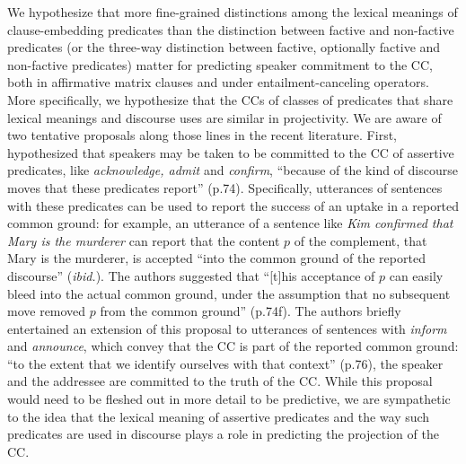 \documentclass[11pt,fleqn]{article}
\newcommand{\6}{\mbox{$[\hspace*{-.6mm}[$}}
\newcommand{\9}{\mbox{$]\hspace*{-.6mm}]$}}
\begin{document}
{We hypothesize that more fine-grained distinctions among the lexical meanings of clause-embedding predicates than the distinction between factive and non-factive predicates (or the three-way distinction between factive, optionally factive and non-factive predicates) matter for predicting speaker commitment to the CC, both in affirmative matrix clauses and under entailment-canceling operators. More specifically, we hypothesize that the CCs of classes of predicates that share lexical meanings and discourse uses are similar in projectivity. We are aware of two tentative proposals along those lines in the recent literature. First, \citet{anand-hacquard2014} hypothesized that speakers may be taken to be committed to the CC of assertive predicates, like {\em acknowledge, admit} and {\em confirm},  ``because of the kind of discourse moves that these predicates report'' (p.74). Specifically, utterances of sentences with these predicates can be used to report the success of an uptake in a reported common ground: for example, an utterance of a sentence like {\em Kim confirmed that Mary is the murderer} can report that the content $p$ of the  complement, that Mary is the murderer, is accepted ``into the common ground of the reported discourse'' ({\em ibid.}). The authors suggested that ``[t]his acceptance of $p$ can easily bleed into the actual common ground, under the assumption that no subsequent move removed $p$ from the common ground'' (p.74f). The authors briefly entertained an extension of this proposal to utterances of sentences with {\em inform} and {\em announce}, which convey that the CC is part of the reported common ground: ``to the extent that we identify ourselves with that context'' (p.76), the speaker and the addressee are committed to the truth of the CC. While this proposal would need to be fleshed out in more detail to be predictive, we are sympathetic to the idea that the lexical meaning of assertive predicates and the way such predicates are used in discourse plays a role in predicting the projection of the CC.

}
\end{document}
